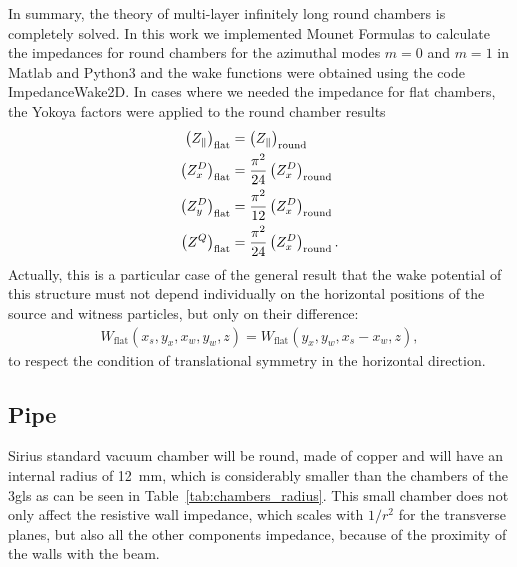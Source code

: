     In summary, the theory of multi-layer infinitely long round chambers is completely solved. In this work we implemented Mounet Formulas to calculate the impedances for round chambers for the azimuthal modes $m=0$ and $m=1$ in Matlab and Python3 and the wake functions were obtained using the code ImpedanceWake2D. In cases where we needed the impedance for flat chambers, the Yokoya factors were applied to the round chamber results
    \begin{align}
        \left(Z_\parallel\right)_\text{flat} &=
                        \left(Z_\parallel\right)_\text{round}\\
        \left(Z_x^D\right)_\text{flat} &= \frac{\pi^2}{24}
                        \left(Z_x^D\right)_\text{round}\\
        \left(Z_y^D\right)_\text{flat} &= \frac{\pi^2}{12}
                        \left(Z_x^D\right)_\text{round}\\
        \left(Z^Q\right)_\text{flat} &= \frac{\pi^2}{24}
                        \left(Z_x^D\right)_\text{round}.
    \end{align}
    Actually, this is a particular case of the general result that the wake potential of this structure must not depend individually on the horizontal positions of the source and witness particles, but only on their difference:
    \begin{align}\nonumber
        W_\text{flat}(x_s,y_x,x_w,y_w,z)=W_\text{flat}(y_x,y_w,x_s-x_w,z),
    \end{align}
    to respect the condition of translational symmetry in the horizontal direction.

\subsection{Pipe}

    Sirius standard vacuum chamber will be round, made of copper and will have an internal radius of \SI{12}{\milli\meter}, which is considerably smaller than the chambers of the \gls{3gls} as can be seen in Table~\ref{tab:chambers_radius}. This small chamber does not only affect the resistive wall impedance, which scales with $1/r^2$ for the transverse planes, but also all the other components impedance, because of the proximity of the walls with the beam.

